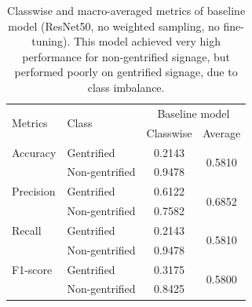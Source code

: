 \begin{table}[h]
\begin{tabular}{llcc}
\multirow{2}{*}{Metrics}   & \multirow{2}{*}{Class} & \multicolumn{2}{c}{Baseline model}        \\ \cline{3-4} 
                           &                        & Classwise & Average                 \\ \hline
Accuracy                   & Gentrified             & 0.2143    & \multirow{2}{*}{0.5810} \\
                           & Non-gentrified         & 0.9478    &                         \\
Precision                  & Gentrified             & 0.6122    & \multirow{2}{*}{0.6852} \\
                           & Non-gentrified         & 0.7582    &                         \\
Recall                     & Gentrified             & 0.2143    & \multirow{2}{*}{0.5810} \\
                           & Non-gentrified         & 0.9478    &                         \\
F1-score                   & Gentrified             & 0.3175    & \multirow{2}{*}{0.5800} \\
                           & Non-gentrified         & 0.8425    &                        
\end{tabular}
\caption{Classwise and macro-averaged metrics of baseline model (ResNet50, no weighted sampling, no fine-tuning). This model achieved very high performance for non-gentrified signage, but performed poorly on gentrified signage, due to class imbalance.}
\label{fig:baseline_metrics}
\end{table}


